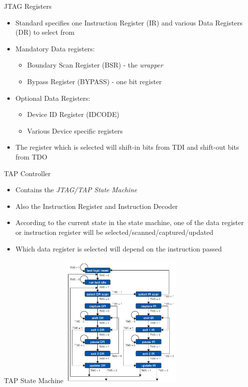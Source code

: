 \documentclass{beamer}
\begin{document}
\begin{frame}{JTAG Registers}
    \begin{itemize}
    \item Standard specifies one Instruction Register (IR) and various 
        Data Registers (DR) to select from
    \item Mandatory Data registers:
        \begin{itemize}
        \item Boundary Scan Register (BSR) - the \emph{wrapper}
        \item Bypass Register (BYPASS) - one bit register
        \end{itemize}
    \item Optional Data Registers:
        \begin{itemize}
        \item Device ID Register (IDCODE)
        \item Various Device specific registers
        \end{itemize}
    \item The register which is selected will shift-in bits from TDI and shift-out
        bits from TDO
    \end{itemize}
\end{frame}

\begin{frame}{TAP Controller}
    \begin{itemize}
    \item Contains the \emph{JTAG/TAP State Machine}
    \item Also the Instruction Register and Instruction Decoder
    \item According to the current state in the state machine, one of the data 
        register or instruction register will be selected/scanned/captured/updated
    \item Which data register is selected will depend on the instruction passed
    \end{itemize}
\end{frame}

\begin{frame}{TAP State Machine}
    \includegraphics[width=6cm]{images/tap_state_machine.jpg}
\end{frame}
\end{document}
